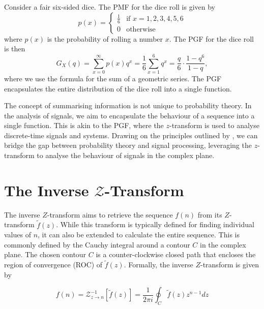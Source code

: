 \documentclass[a4paper]{report}
\begin{document}
\begin{example}
    Consider a fair six-sided dice. The PMF for the dice roll is given by
    \begin{equation}
        p(x) = \begin{cases}
            \frac{1}{6} & \text{if } x = 1, 2, 3, 4, 5, 6 \\
            0 & \text{otherwise}
        \end{cases}
    \end{equation}
    where $p(x)$ is the probability of rolling a number $x$. The PGF for the dice roll is then
    \begin{equation}
        G_X(q) = \sum^{\infty}_{x = 0} p(x)q^x = \frac{1}{6} \sum^6_{x = 1} q^x = \frac{q}{6}\cdot \frac{1-q^6}{1-q},
    \end{equation}
    where we use the formula for the sum of a geometric series. The PGF encapsulates the entire distribution of the dice roll into a single function.
\end{example}

The concept of summarising information is not unique to probability theory. In the analysis of signals, we aim to encapsulate the behaviour of a sequence into a single function. This is akin to the PGF, where the $z$-transform is used to analyse discrete-time signals and systems. Drawing on the principles outlined by \citet{ross2014introduction}, we can bridge the gap between probability theory and signal processing, leveraging the $z$-transform to analyse the behaviour of signals in the complex plane.

\section{The Inverse \texorpdfstring{$\mathcal{Z}$}{Lg}-Transform}\label{section:inverse_z}
The inverse $Z$-transform aims to retrieve the sequence $f(n)$ from its $Z$-transform $\tilde{f}(z)$. While this transform is typically defined for finding individual values of $n$, it can also be extended to calculate the entire sequence. This is commonly defined by the Cauchy integral around a contour $C$ in the complex plane. The chosen contour $C$ is a counter-clockwise closed path that encloses the region of convergence (ROC) of $\tilde{f}(z)$. Formally, the inverse $Z$-transform is given by

\begin{equation}\label{inverse_z-transform}
	f(n) = \mathcal{Z}^{-1}_{z \rightarrow n}[\tilde{f}(z)] = \frac{1}{2\pi i} \oint_C \tilde{f}(z)z^{n-1}dz
\end{equation}
\end{document}
